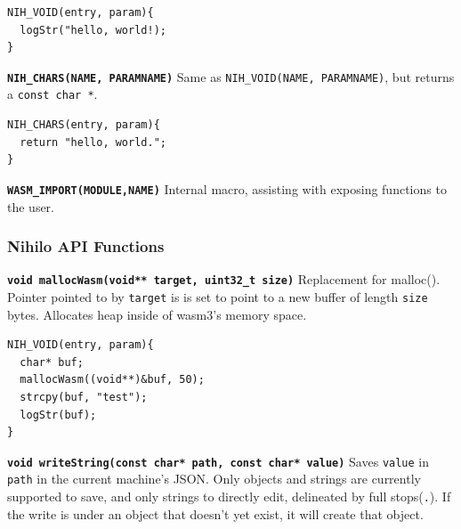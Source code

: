 \documentclass{article}
\begin{document}
\begin{tcolorbox}[colback=white,grow to left by=2.5mm,grow to right by=2.5mm,left*=0mm,right*=0mm,sharp corners]
\begin{verbatim}
NIH_VOID(entry, param){
  logStr("hello, world!);
}
\end{verbatim}
\end{tcolorbox}

\textbf{\texttt{NIH\_CHARS(NAME, PARAMNAME)}}\newline
Same as \texttt{NIH\_VOID(NAME, PARAMNAME)}, but returns a \texttt{const char *}.

\begin{tcolorbox}[colback=white,grow to left by=2.5mm,grow to right by=2.5mm,left*=0mm,right*=0mm,sharp corners]
\begin{verbatim}
NIH_CHARS(entry, param){
  return "hello, world.";
}
\end{verbatim}
\end{tcolorbox}

\textbf{\texttt{WASM\_IMPORT(MODULE,NAME)}}\newline
Internal macro, assisting with exposing functions to the user.

\subsubsection{Nihilo API Functions}

\textbf{\texttt{void mallocWasm(void** target, uint32\_t size)}}\newline
Replacement for malloc(). Pointer pointed to by \texttt{target} is is set to point to a new buffer of length \texttt{size} bytes. Allocates heap inside of wasm3's memory space.

\begin{tcolorbox}[colback=white,grow to left by=2.5mm,grow to right by=2.5mm,left*=0mm,right*=0mm,sharp corners]
\begin{verbatim}
NIH_VOID(entry, param){
  char* buf;
  mallocWasm((void**)&buf, 50);
  strcpy(buf, "test");
  logStr(buf);
}
\end{verbatim}
\end{tcolorbox}

\textbf{\texttt{void writeString(const char* path, const char* value)}}\newline
Saves \texttt{value} in \texttt{path} in the current machine's JSON. Only objects and strings are currently supported to save, and only strings to directly edit, delineated by full stops(\texttt{.}). If the write is under an object that doesn't yet exist, it will create that object.
\end{document}

